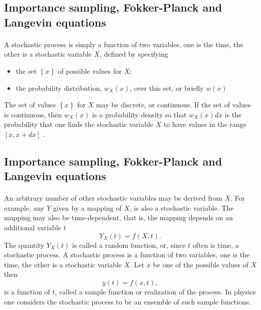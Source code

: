 \documentclass[%
twoside,                 %
final,                   %
10pt]{article}
\begin{document}
{{{{{{%
\subsection{Importance sampling, Fokker-Planck and Langevin equations}

\paragraph{}
A stochastic process is simply a function of two variables, one is the time,
the other is a stochastic variable $X$, defined by specifying
\begin{itemize}
\item the set $\left\{x\right\}$ of possible values for $X$;

\item the probability distribution, $w_X(x)$,  over this set, or briefly $w(x)$
\end{itemize}

\noindent
The set of values $\left\{x\right\}$ for $X$ 
may be discrete, or continuous. If the set of
values is continuous, then $w_X (x)$ is a probability density so that 
$w_X (x)dx$
is the probability that one finds the stochastic variable $X$ to have values
in the range $[x, x + dx]$ .




\subsection{Importance sampling, Fokker-Planck and Langevin equations}

\paragraph{}
     An arbitrary number of other stochastic variables may be derived from
$X$. For example, any $Y$ given by a mapping of $X$, is also a stochastic
variable. The mapping may also be time-dependent, that is, the mapping
depends on an additional variable $t$
\[
                              Y_X (t) = f (X, t) .
\]
The quantity $Y_X (t)$ is called a random function, or, since $t$ often is time,
a stochastic process. A stochastic process is a function of two variables,
one is the time, the other is a stochastic variable $X$. Let $x$ be one of the
possible values of $X$ then
\[
                               y(t) = f (x, t),
\]
is a function of $t$, called a sample function or realization of the process.
In physics one considers the stochastic process to be an ensemble of such
sample functions.



}}}}}}
\end{document}
